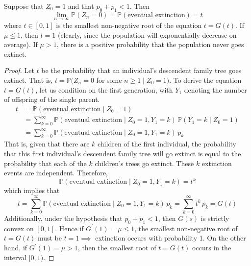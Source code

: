     \begin{theorem}
      Suppose that $Z_0 = 1$ and that $p_0 + p_1 < 1$. Then
      \begin{equation}
        \lim_{n \rightarrow \infty} \mathbb{P}(Z_n = 0) = \mathbb{P}(\text{eventual extinction}) = t
      \end{equation}
      where $t \in [0, 1]$ is the smallest non-negative root of the equation $t = G(t)$. If $\mu \leq 1$, then $t = 1$ (clearly, since the population will exponentially decrease on average). If $\mu > 1$, there is a positive probability that the population never goes extinct. 
    \end{theorem}
    \begin{proof}
      Let $t$ be the probability that an individual's descendent family tree goes extinct. That is, $t = \mathbb{P}(Z_n = 0$ for some $n \geq 1 \; | \; Z_0 = 1)$. To derive the equation $t = G(t)$, let us condition on the first generation, with $Y_1$ denoting the number of offspring of the single parent. 
      \begin{align*}
        t & = \mathbb{P}(\text{eventual extinction} \; | \; Z_0 = 1) \\
        & = \sum_{k=0}^\infty \mathbb{P}(\text{eventual extinction} \; | \; Z_0 = 1, Y_1 = k) \, \mathbb{P}(Y_1 = k \; | \; Z_0 = 1) \\
        & = \sum_{k=0}^\infty \mathbb{P}(\text{eventual extinction} \; | \;Z_0 =1, Y_1 = k) \, p_k
      \end{align*}
      That is, given that there are $k$ children of the first individual, the probability that this first individual's descendent family tree will go extinct is equal to the probability that each of the $k$ children's trees go extinct. These $k$ extinction events are independent. Therefore, 
      \begin{equation}
        \mathbb{P}(\text{eventual extinction} \; | \;Z_0 = 1, Y_1 = k) = t^k
      \end{equation}
      which implies that 
      \begin{equation}
        t = \sum_{k=0}^\infty \mathbb{P}(\text{eventual extinction} \; | \; Z_0 = 1, Y_1 = k) \, p_k = \sum_{k=0}^\infty t^k \, p_k = G(t)
      \end{equation}
      Additionally, under the hypothesis that $p_0 + p_1 < 1$, then $G(s)$ is strictly convex on $[0,1]$. Hence if $G^\prime (1) = \mu \leq 1$, the smallest non-negative root of $t = G(t)$ must be $t=1 \implies$ extinction occurs with probability 1. On the other hand, if $G^\prime (1) = \mu > 1$, then the smallest root of $t = G(t)$ occurs in the interval $[0,1)$. 
    \end{proof}

